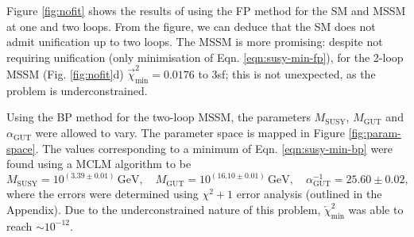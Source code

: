 \documentclass[12pt,a4paper,oneside]{article}
\begin{document}
Figure \ref{fig:nofit} shows the results of using the FP method for the SM and MSSM at one and two loops. From the figure, we can deduce that the SM does not admit unification up to two loops. The MSSM is more promising: despite not requiring unification (only minimisation of Eqn. \ref{eqn:susy-min-fp}), for the 2-loop MSSM (Fig. \ref{fig:nofit}d)  $\overrightarrow{\chi}^2_\mathrm{min} = 0.0176$ to 3sf; this is not unexpected, as the problem is underconstrained.

Using the BP method for the two-loop MSSM, the parameters $M_\mathrm{SUSY}$, $M_\mathrm{GUT}$ and $\alpha_\mathrm{GUT}$ were allowed to vary. The parameter space is mapped in Figure \ref{fig:param-space}. The values corresponding to a minimum of Eqn. \ref{eqn:susy-min-bp} were found using a MCLM algorithm to be
\begin{equation}
M_\mathrm{SUSY} = 10^{(3.39 \pm 0.01)} \, \mathrm{GeV}, \quad
M_\mathrm{GUT} = 10^{(16.10 \pm 0.01)} \, \mathrm{GeV}, \quad
\alpha^{-1}_\mathrm{GUT} = 25.60 \pm 0.02,
\label{eqn:min-bp-params}
\end{equation}
where the errors were determined using $\chi^2 + 1$ error analysis (outlined in the Appendix). Due to the underconstrained nature of this problem, $\overleftarrow{\chi}^2_\mathrm{min}$ was able to reach $\sim 10^{-12}$.
\end{document}
